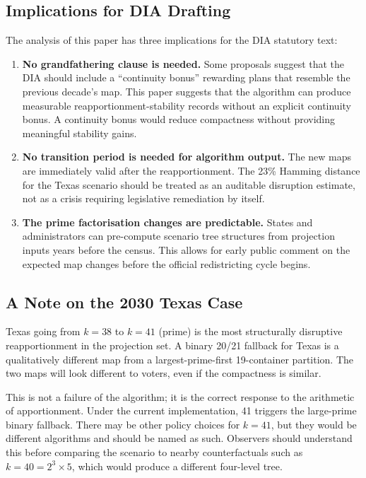 \subsection{Implications for DIA Drafting}

The analysis of this paper has three implications for the DIA statutory text:

\begin{enumerate}
\item \textbf{No grandfathering clause is needed.}
      Some proposals suggest that the DIA should include a ``continuity
      bonus'' rewarding plans that resemble the previous decade's map.
      This paper suggests that the \ar{} algorithm can produce
      measurable reapportionment-stability records without an explicit
      continuity bonus.
      A continuity bonus would reduce compactness without providing
      meaningful stability gains.

\item \textbf{No transition period is needed for algorithm output.}
      The new maps are immediately valid after the reapportionment.
      The 23\% Hamming distance for the Texas scenario should be treated as
      an auditable disruption estimate, not as a crisis requiring legislative
      remediation by itself.

\item \textbf{The prime factorisation changes are predictable.}
      States and administrators can pre-compute scenario tree structures
      from projection inputs years before the census.
      This allows for early public comment on the expected map changes
      before the official redistricting cycle begins.
\end{enumerate}

\subsection{A Note on the 2030 Texas Case}

Texas going from $k = 38$ to $k = 41$ (prime) is the most structurally
disruptive reapportionment in the projection set.
A binary 20/21 fallback for Texas is a qualitatively different map from
a largest-prime-first 19-container partition.
The two maps will look different to voters, even if the compactness is
similar.

This is not a failure of the algorithm; it is the correct response to the
arithmetic of apportionment.
Under the current implementation, 41 triggers the large-prime binary fallback.
There may be other policy choices for $k=41$, but they would be different
algorithms and should be named as such.
Observers should understand this before comparing the scenario to nearby
counterfactuals such as $k = 40 = 2^3 \times 5$, which would produce a
different four-level tree.
